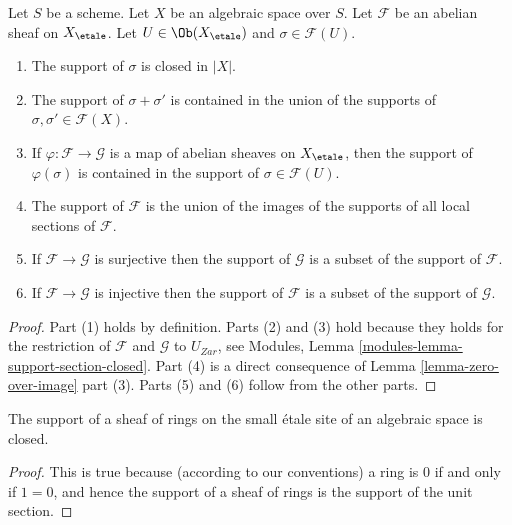 \begin{lemma}
\label{lemma-support-section-closed}
Let $S$ be a scheme.
Let $X$ be an algebraic space over $S$.
Let $\mathcal{F}$ be an abelian sheaf on $X_\etale$.
Let $U \in \Ob(X_\etale)$ and $\sigma \in \mathcal{F}(U)$.
\begin{enumerate}
\item The support of $\sigma$ is closed in $|X|$.
\item The support of $\sigma + \sigma'$ is contained in the union of
the supports of $\sigma, \sigma' \in \mathcal{F}(X)$.
\item If $\varphi : \mathcal{F} \to \mathcal{G}$ is a map of
abelian sheaves on $X_\etale$, then the support of $\varphi(\sigma)$ is
contained in the support of $\sigma \in \mathcal{F}(U)$.
\item The support of $\mathcal{F}$ is the union of the images of the
supports of all local sections of $\mathcal{F}$.
\item If $\mathcal{F} \to \mathcal{G}$ is surjective then the support
of $\mathcal{G}$ is a subset of the support of $\mathcal{F}$.
\item If $\mathcal{F} \to \mathcal{G}$ is injective then the support
of $\mathcal{F}$ is a subset of the support of $\mathcal{G}$.
\end{enumerate}
\end{lemma}

\begin{proof}
Part (1) holds by definition.
Parts (2) and (3) hold because they holds for the restriction of
$\mathcal{F}$ and $\mathcal{G}$ to $U_{Zar}$, see
Modules, Lemma \ref{modules-lemma-support-section-closed}.
Part (4) is a direct consequence of
Lemma \ref{lemma-zero-over-image} part (3).
Parts (5) and (6) follow from the other parts.
\end{proof}

\begin{lemma}
\label{lemma-support-sheaf-rings-closed}
The support of a sheaf of rings on the small \'etale site of an
algebraic space is closed.
\end{lemma}

\begin{proof}
This is true because (according to our conventions)
a ring is $0$ if and only if
$1 = 0$, and hence the support of a sheaf of rings
is the support of the unit section.
\end{proof}






